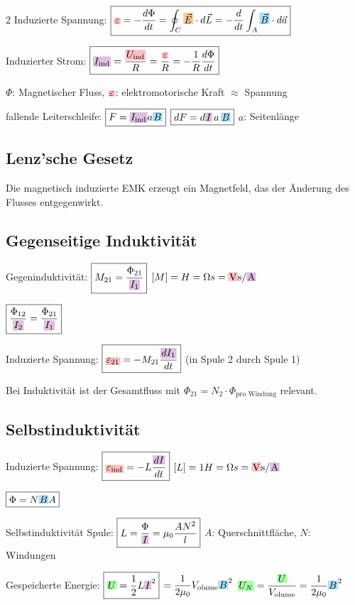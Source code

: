 \documentclass[10pt,a4paper]{article}
\newcommand{\yhbox}[1]{%
  \par\vspace{2pt}\noindent%
  \colorbox{yellow!35}{\parbox{\dimexpr\linewidth-2\fboxsep\relax}{\small#1}}%
  \par\vspace{2pt}}
\newcommand{\bhbox}[1]{%
  \par\vspace{2pt}\noindent%
  \colorbox{blue!12}{\parbox{\dimexpr\linewidth-2\fboxsep\relax}{\small#1}}%
  \par\vspace{2pt}}
\newcommand{\ec}[1]{{\setlength\fboxsep{1pt}\colorbox{green!35}{\ensuremath{#1}}}}
\newcommand{\icc}[1]{{\setlength\fboxsep{1pt}\colorbox{violet!25}{\ensuremath{#1}}}}
\newcommand{\efc}[1]{{\setlength\fboxsep{1pt}\colorbox{orange!40}{\ensuremath{#1}}}}
\newcommand{\bfc}[1]{{\setlength\fboxsep{1pt}\colorbox{cyan!35}{\ensuremath{#1}}}}
\newcommand{\vc}[1]{{\setlength\fboxsep{1pt}\colorbox{red!25}{\ensuremath{#1}}}}
\begin{document}
\begin{multicols}{2}
Induzierte Spannung: $\boxed{\vc{\varepsilon}=-\frac{d\Phi}{dt}=\oint_C\efc{\vec{E}}\cdot d\vec{L}=-\frac{d}{dt}\int_A\bfc{\vec{B}}\cdot d\vec{a}}$

Induzierter Strom: $\boxed{\icc{I_{\text{ind}}}=\dfrac{\vc{U_{\text{ind}}}}{R}=\dfrac{\vc{\varepsilon}}{R}=-\dfrac{1}{R}\dfrac{d\Phi}{dt}}$

$\Phi$: Magnetischer Fluss, $\vc{\varepsilon}$: elektromotorische Kraft $\approx$ Spannung

fallende Leiterschleife: $\boxed{F=\icc{I_{\text{ind}}}a\bfc{B}}$ \quad $\boxed{dF=d\icc{I}\,a\,\bfc{B}}$ \quad $a$: Seitenlänge

\subsection{Lenz'sche Gesetz}

\bhbox{Die magnetisch induzierte EMK erzeugt ein Magnetfeld, das der Änderung des Flusses entgegenwirkt.}

\subsection{Gegenseitige Induktivität}

Gegeninduktivität: $\boxed{M_{21}=\dfrac{\Phi_{21}}{\icc{I_1}}}$ \quad $[M]=H=\Omega s=\vc{\text{V}}\text{s}/\icc{\text{A}}$

$\boxed{\dfrac{\Phi_{12}}{\icc{I_2}}=\dfrac{\Phi_{21}}{\icc{I_1}}}$

Induzierte Spannung: $\boxed{\vc{\varepsilon_{21}}=-M_{21}\dfrac{\icc{dI_1}}{dt}}$ \quad (in Spule 2 durch Spule 1)

\yhbox{Bei Induktivität ist der Gesamtfluss mit $\Phi_{21}=N_2\cdot\Phi_{\text{pro Windung}}$ relevant.}

\subsection{Selbstinduktivität}

Induzierte Spannung: $\boxed{\vc{\varepsilon_{\text{ind}}}=-L\dfrac{\icc{dI}}{dt}}$ \quad $[L]=1H=\Omega s=\vc{\text{V}}\text{s}/\icc{\text{A}}$

$\boxed{\Phi=N\bfc{B}A}$

Selbstinduktivität Spule: $\boxed{L=\dfrac{\Phi}{\icc{I}}=\mu_0\dfrac{AN^2}{l}}$ \quad $A$: Querschnittfläche, $N$: Windungen

Gespeicherte Energie: $\boxed{\ec{U}=\dfrac{1}{2}L\icc{I}^2}$ $=\dfrac{1}{2\mu_0}V_{\text{olume}}\bfc{B}^2$ \quad $\ec{U_N}=\dfrac{\ec{U}}{V_{\text{olume}}}=\dfrac{1}{2\mu_0}\bfc{B}^2$


\end{multicols}
\end{document}
